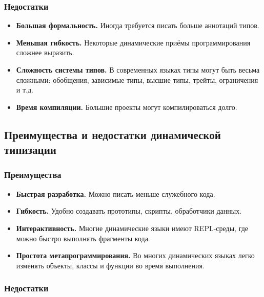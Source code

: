 \documentclass[12pt,a4paper]{article}
\begin{document}
\subsubsection{Недостатки}

\begin{itemize}
    \item \textbf{Большая формальность.}
    Иногда требуется писать больше аннотаций типов.

    \item \textbf{Меньшая гибкость.}
    Некоторые динамические приёмы программирования сложнее выразить.

    \item \textbf{Сложность системы типов.}
    В современных языках типы могут быть весьма сложными: обобщения, зависимые типы,
    высшие типы, трейты, ограничения и т.д.

    \item \textbf{Время компиляции.}
    Большие проекты могут компилироваться долго.
\end{itemize}

\subsection{Преимущества и недостатки динамической типизации}

\subsubsection{Преимущества}

\begin{itemize}
    \item \textbf{Быстрая разработка.}
    Можно писать меньше служебного кода.

    \item \textbf{Гибкость.}
    Удобно создавать прототипы, скрипты, обработчики данных.

    \item \textbf{Интерактивность.}
    Многие динамические языки имеют REPL-среды, где можно быстро выполнять фрагменты
    кода.

    \item \textbf{Простота метапрограммирования.}
    Во многих динамических языках легко изменять объекты, классы и функции во время
    выполнения.
\end{itemize}

\subsubsection{Недостатки}
\end{document}
